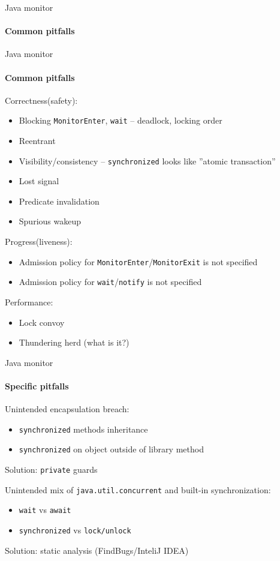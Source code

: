 \begin{frame}[t]{Java monitor}
\framesubtitle{Common pitfalls}

\end{frame}



\begin{frame}[t,noframenumbering]{Java monitor}
\framesubtitle{Common pitfalls}

Correctness(safety):
\begin{itemize}
    \item Blocking \texttt{MonitorEnter}, \texttt{wait} -- deadlock, locking order
    \item Reentrant
    \item Visibility/consistency -- \texttt{synchronized} looks like ''atomic transaction''
    \item Lost signal
    \item Predicate invalidation
    \item Spurious wakeup
\end{itemize}

Progress(liveness):
\begin{itemize}
    \item Admission policy for \texttt{MonitorEnter}/\texttt{MonitorExit} is not specified
    \item Admission policy for \texttt{wait}/\texttt{notify} is not specified
\end{itemize}

Performance:
\begin{itemize}
    \item Lock convoy
    \item Thundering herd \pause (what is it?)
\end{itemize}

\end{frame}


\begin{frame}[t]{Java monitor}
\framesubtitle{Specific pitfalls}

Unintended encapsulation breach:
\begin{itemize}
    \item \texttt{synchronized} methods inheritance
    \item \texttt{synchronized} on object outside of library method
\end{itemize}

Solution: \texttt{private} guards
\
\
\

\pause

Unintended mix of \texttt{java.util.concurrent} and built-in synchronization:
\begin{itemize}
    \item \texttt{wait} vs \texttt{await}
    \item \texttt{synchronized} vs \texttt{lock/unlock}
\end{itemize}

Solution: static analysis (FindBugs/InteliJ IDEA)

\end{frame}

